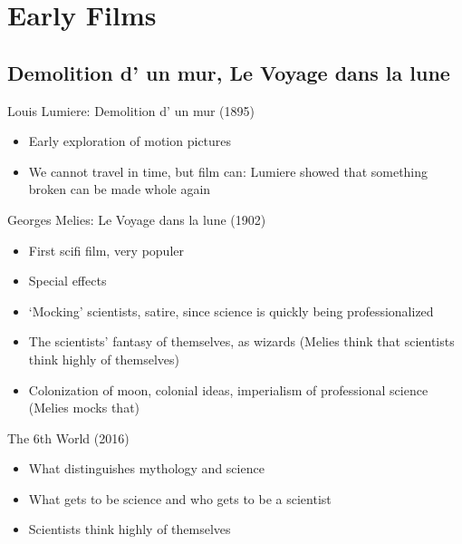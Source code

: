 \documentclass[11pt,fleqn]{book} %
\begin{document}
\section{Early Films}
\subsection{Demolition d’ un mur, Le Voyage dans la lune}
\begin{descriptions}
    \item[Louis Lumiere: Demolition d’ un mur (1895)]
    \begin{descriptions}
    \end{descriptions}
    \begin{itemize}
        \item Early exploration of motion pictures
        \item We cannot travel in time, but film can: Lumiere showed that something broken can be made whole again
    \end{itemize}
    \item[Georges Melies: Le Voyage dans la lune (1902)] 
    \begin{descriptions}
    \end{descriptions}
    \begin{itemize}
        \item First scifi film, very populer
        \item Special effects
        \item ‘Mocking’ scientists, satire, since science is quickly being professionalized
        \item The scientists’ fantasy of themselves, as wizards (Melies think that scientists think highly of themselves)
        \item Colonization of moon, colonial ideas, imperialism of professional science (Melies mocks that)
    \end{itemize}
    \item[The 6th World (2016)]
    \begin{descriptions}
    \end{descriptions}
    \begin{itemize}
        \item What distinguishes mythology and science
        \item What gets to be science and who gets to be a scientist
        \item Scientists think highly of themselves
    \end{itemize}
\end{descriptions}
\end{document}
